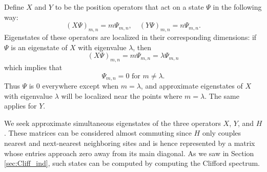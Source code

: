 \documentclass[a4paper]{article}
\begin{document}
Define $X$ and $Y$ to be the position operators that act on a state $\Psi$ in the following way:
\begin{equation}\label{eq:xy}
(X \Psi)_{m,n} = m\Psi_{m,n}, \quad (Y \Psi)_{m,n} = n\Psi_{m,n}.
\end{equation}
Eigenstates of these operators are localized in their corresponding dimensions: if $\Psi$ is an eigenstate of $X$ with eigenvalue $\lambda$, then
\begin{equation}
(X \Psi)_{m,n} = m\Psi_{m,n} = \lambda\Psi_{m,n}
\end{equation}
which implies that
\begin{equation}
\Psi_{m,n} = 0 \text{ for } m \neq \lambda.
\end{equation}
Thus $\Psi$ is 0 everywhere except when $m = \lambda$, and approximate eigenstates of $X$ with eigenvalue $\lambda$ will be localized near the points where $m = \lambda$.
The same applies for $Y$.

We seek approximate simultaneous eigenstates of the three operators $X$, $Y$, and $H$. These matrices can be considered almost commuting since $H$ only couples nearest and next-nearest neighboring sites and is hence represented by a matrix whose entries approach zero away from its main diagonal. As we saw in Section \ref{sec:Cliff_ind}, such states can be computed by computing the Clifford spectrum.
\end{document}
